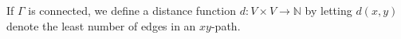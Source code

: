 If $\Gamma$ is connected, we define a distance function $d: V \times V \to \mathbb{N}$ by letting $d(x, y)$ denote the least number of edges in an $xy$-path.

